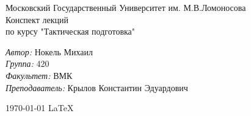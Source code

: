 \documentclass[a4paper,12pt]{article}
\date{\today}
\begin{document}
	\begin{titlepage}
		\begin{center}
			\large Московский Государственный Университет им. М.В.Ломоносова\\[4,5cm]
			\huge Конспект лекций \\[0,6cm]
			\large по курсу "Тактическая подготовка"\\[3,7cm]
				\begin{minipage}{0,5\textwidth}
					\begin{flushleft}
						\emph{Автор:} Нокель Михаил\\
						\emph{Группа:} 420\\
						\emph{Факультет:} ВМК\\
						\emph{Преподаватель:} Крылов Константин Эдуардович\\
					\end{flushleft}					
				\end{minipage}	
			\vfill
			{\large \today}
			{\large \LaTeX}			
		\end{center}
	\thispagestyle{empty}
	\end{titlepage}
	\newpage
	\tableofcontents
	\newpage
\end{document}
